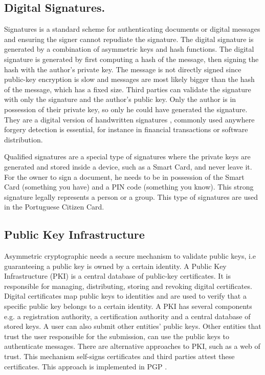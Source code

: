 \subsection{Digital Signatures.} \label{crypto:signatures}

Signatures is a standard scheme for authenticating documents or digital messages and ensuring the signer cannot repudiate the signature. The digital signature is generated by a combination of asymmetric keys and hash functions.
The digital signature is generated by first computing a hash of the message, then signing the hash with the author's private key. The message is not directly signed since public-key encryption is slow and messages are most likely bigger than the hash of the message, which has a fixed size. Third parties can validate the signature with only the signature and the author's public key. Only the author is in possession of their private key, so only he could have generated the signature.
They are a digital version of handwritten signatures \cite{digitalsignatures}, commonly used anywhere forgery detection is essential, for instance in financial transactions or software distribution.

Qualified signatures are a special type of signatures where the private keys are generated and stored inside a device, such as a Smart Card, and never leave it. For the owner to sign a document, he needs to be in possession of the Smart Card (something you have) and a PIN code (something you know). This strong signature legally represents a person or a group. This type of signatures are used in the Portuguese Citizen Card.

\subsection{Public Key Infrastructure} \label{PKI}

Asymmetric cryptographic needs a secure mechanism to validate public keys, i.e guaranteeing a public key is owned by a certain identity.
A Public Key Infrastructure (PKI) is a central database of public-key certificates. It is responsible for managing, distributing, storing and revoking digital certificates. Digital certificates map public keys to identities and are used to verify that a specific public key belongs to a certain identity.
A PKI has several components e.g. a registration authority, a certification authority and a central database of stored keys.
A user can also submit other entities' public keys. Other entities that trust the user responsible for the submission, can use the public keys to authenticate messages.
There are alternative approaches to PKI, such as a web of trust. This mechanism self-signs certificates and third parties attest these certificates. This approach is implemented in PGP \cite{modelingPKI}.

